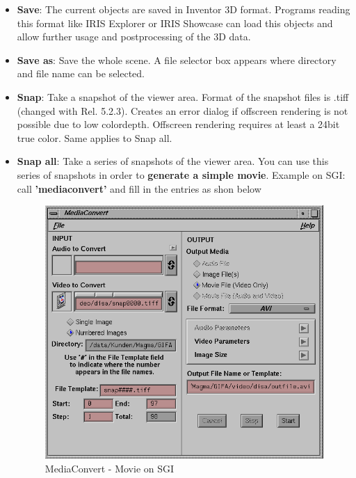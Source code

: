 \begin{itemize}
\item {\bf Save}: The current objects are saved in Inventor 3D format. Programs reading this format
like IRIS Explorer or IRIS Showcase can load this objects and allow further usage
and postprocessing of the 3D data.

\item {\bf Save as}: Save the whole scene. A file selector box appears where directory and file name
can be selected.

\item {\bf Snap}: Take a snapshot of the viewer area. Format of the snapshot files is .tiff
(changed with Rel. 5.2.3). Creates an error dialog if offscreen rendering
is not possible due to low colordepth. Offscreen rendering requires at
least a 24bit true color. Same applies to Snap all.

\item {\bf Snap all}: Take a series of snapshots of the viewer area.\newline
You can use this series of snapshots in order to {\bf generate a simple
movie}.\newline
Example on SGI: call {\bf 'mediaconvert'} and fill in the entries as shon below

 \latexonly
 \begin{figure}[htp]
  \begin{center}
   \includegraphics[scale=0.6]{renderer/pict/mediaconvert}
   \caption{MediaConvert - Movie on SGI}
	\label{fig59a}
  \end{center}
 \end{figure}
 \endlatexonly
\clearpage


\end{itemize}
